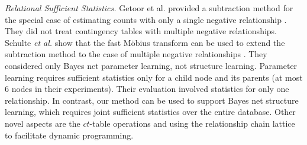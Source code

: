\documentclass{acm_proc_article-sp}
\newcommand{\ct}{\mathit{ct}}
\begin{document}
%
{\em Relational Sufficient Statistics.} Getoor et al. 
provided a subtraction method for the special case of estimating counts with only a single negative relationship \cite[Sec.5.8.4.2]{Getoor2007c}. 
They did not treat contingency tables with multiple negative relationships.
%
Schulte {\em et al.} show that the fast M\"obius transform can be used to extend the subtraction method to the case of multiple negative relationships \cite{Schulte2014}. 
They considered only Bayes net parameter learning, not structure learning. 
Parameter learning requires sufficient statistics only for a child node and its parents (at most 6 nodes in their experiments). 
Their evaluation involved statistics for only one relationship. 
In contrast, our method can be used to support Bayes net structure learning, which requires joint sufficient statistics over the entire database. 
Other novel aspects are the $\ct$-table operations and using the relationship chain lattice to facilitate dynamic programming. 

\end{document}
